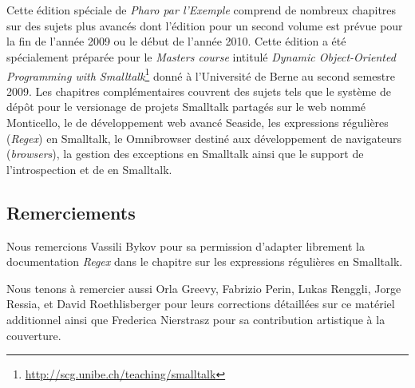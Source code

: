 \documentclass[a4paper,10pt,twoside]{book}
\begin{document}
	\sloppy
	\frontmatter
\fi
\chapter{}
\newcommand{\web}{web\xspace}

Cette édition spéciale de \emph{Pharo par l'Exemple} comprend de
nombreux chapitres sur des sujets plus avancés
dont l'édition pour un second volume est prévue pour la fin de l'année
2009 ou le début de l'année 2010.
Cette édition a été spécialement préparée pour le 
\emph{Masters course} intitulé \emph{Dynamic Object-Oriented
  Programming with
  Smalltalk}\footnote{\url{http://scg.unibe.ch/teaching/smalltalk}}
donné à l'Université de Berne au second semestre 2009.
Les chapitres complémentaires couvrent des sujets tels que le système
de dépôt pour le versionage de projets Smalltalk partagés sur le \web
nommé Monticello,
le \framework de développement \web avancé Seaside,
les expressions régulières (\emph{Regex}) en Smalltalk,
le \framework Omnibrowser destiné aux développement de navigateurs
(\emph{browsers}),
la gestion des exceptions en Smalltalk ainsi que le support de
l'introspection et de  en Smalltalk.

\section*{Remerciements}

Nous remercions Vassili Bykov pour sa permission d'adapter librement
la documentation \emph{Regex} dans le chapitre sur les expressions
régulières en Smalltalk.

Nous tenons à remercier aussi
Orla Greevy,
Fabrizio Perin,
Lukas Renggli,
Jorge Ressia,
et
David Roethlisberger
pour leurs corrections détaillées sur ce matériel additionnel
ainsi que Frederica Nierstrasz pour sa contribution 
artistique à la couverture.




\ifx\wholebook\relax\else
   
   
\end{document}
